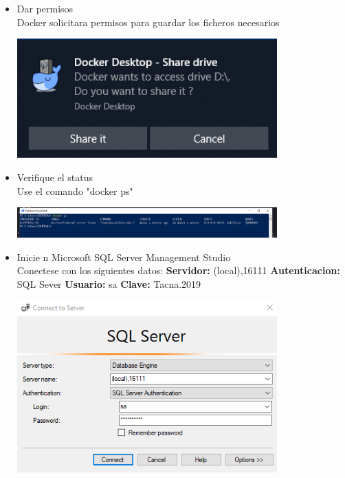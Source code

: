 \begin{itemize}
	\item Dar permisos
	\\Docker solicitara permisos para guardar los ficheros necesarios

	\begin{center}
	\includegraphics[width=10cm]{./Imagenes/14} 
	\end{center}

\end{itemize}  

\begin{itemize}
	\item Verifique el status
	\\Use el comando "docker ps"

	\begin{center}
	\includegraphics[width=10cm]{./Imagenes/16} 
	\end{center}

\end{itemize} 

\begin{itemize}
	\item Inicie n Microsoft SQL Server Management Studio 
	\\Conectese con los siguientes datos: \textbf{Servidor:}  (local),16111 \textbf{Autenticacion:} SQL Sever \textbf{Usuario:} sa \textbf{Clave:} Tacna.2019

	\begin{center}
	\includegraphics[width=10cm]{./Imagenes/17} 
	\end{center}

\end{itemize} 

